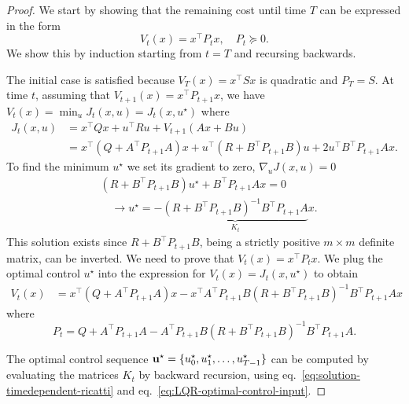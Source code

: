 \begin{proof}
  We start by showing that the remaining cost until time $T$ can be expressed in the form
  \begin{equation}
    \label{eq:LQR-generic-solution}
    V_t(x) = x^\top P_tx,\quad P_t\succeq 0.
  \end{equation}
  We show this by induction starting from $t=T$ and recursing backwards.

  The initial case is satisfied because $V_T(x) = x^\top Sx$ is quadratic and $P_T = S$. At time $t$, assuming that $V_{t+1}(x) = x^\top P_{t+1} x$, we have $V_t(x) = \min_u J_t(x,u) = J_t(x,u^\star)$ where
  \begin{align*}
    J_t(x,u) &= x^\top Qx + u^\top Ru + V_{t+1}(Ax+Bu) \\
             &= x^\top\left(Q + A^\top P_{t+1}A\right) x + u^\top\left(R + B^\top P_{t+1}B\right) u + 2u^\top B^\top P_{t+1}Ax.
  \end{align*}
  To find the minimum $u^\star$ we set its gradient to zero, $\nabla_{u} J(x,u) = 0$
  \begin{align}
    &\left(R + B^\top P_{t+1}B\right)u^\star + B^\top P_{t+1}A x = 0 \nonumber \\
    \label{eq:LQR-optimal-control-input}
    &\quad \rightarrow u^\star = -\underbrace{(R+B^\top P_{t+1}B)^{-1}B^\top P_{t+1}A}_{K_t}x.
  \end{align}
  This solution exists since $R+B^\top P_{t+1}B$, being a strictly positive $m\times m$ definite matrix, can be inverted. We need to prove that $V_t(x)= x^\top P_t x$. We plug the optimal control $u^\star$ into the expression for $V_t(x)=J_t(x,u^\star)$ to obtain
  \begin{align*}
    V_t(x) &= x^\top \left(Q + A^\top P_{t+1}A\right) x - x^\top A^\top P_{t+1}B\left(R+B^\top P_{t+1}B\right)^{-1}B^\top P_{t+1}Ax
  \end{align*}
  where
  \begin{equation}
    \label{eq:solution-timedependent-ricatti}
    P_t = Q + A^\top P_{t+1}A - A^\top P_{t+1}B\left(R+B^\top P_{t+1}B\right)^{-1}B^\top P_{t+1}A.
  \end{equation}

The optimal control sequence $\boldsymbol{\mathrm{u}}^\star = \{u_0^\star, u_1^\star,\ldots,u_{T-1}^\star\}$ can be computed by evaluating the matrices $K_t$ by backward recursion, using eq.~\eqref{eq:solution-timedependent-ricatti} and eq.~\eqref{eq:LQR-optimal-control-input}.
\end{proof}

